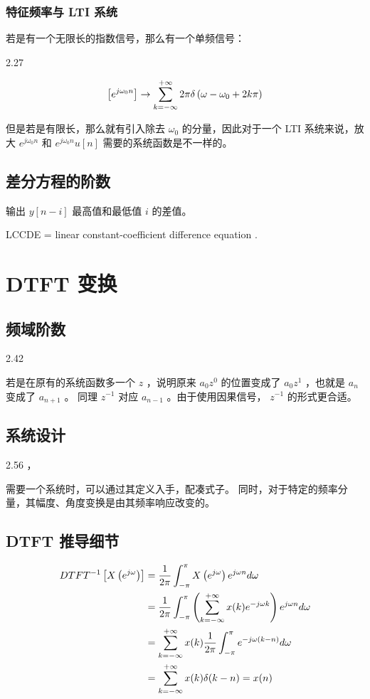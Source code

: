 \documentclass[cn,11pt,chinese,black,simple]{elegantbook}
\begin{document}
\subsection{特征频率与 LTI 系统}

若是有一个无限长的指数信号，那么有一个单频信号：

2.27

\[
    \left[e^{j \omega_{0} n}\right]\rightarrow \displaystyle\sum_{k=-\infty}^{+\infty} 2 \pi \delta\left(\omega-\omega_{0}+2 k \pi\right)
\]

但是若是有限长，那么就有引入除去 \(\omega_0\) 的分量，因此对于一个 LTI 系统来说，放大 \(e^{j \omega_0 n}\) 和 \(e^{j \omega_0 n} u[n]\) 需要的系统函数是不一样的。

\section{差分方程的阶数}

输出 \(y[n-i]\) 最高值和最低值 \(i\) 的差值。

LCCDE = linear constant-coefficient difference equation .



\chapter{DTFT 变换}


\section{频域阶数}

2.42

若是在原有的系统函数多一个 \(z\) ，说明原来 \(a_0 z^0\) 的位置变成了 \(a_0 z^1\) ，也就是 \(a_n\) 变成了 \(a_{n+1}\) 。 同理 \(z^{-1}\) 对应 \(a_{n-1}\) 。由于使用因果信号， \(z^{-1}\) 的形式更合适。

\section{系统设计}

2.56 ，

需要一个系统时，可以通过其定义入手，配凑式子。 同时，对于特定的频率分量，其幅度、角度变换是由其频率响应改变的。

\section{DTFT 推导细节}

\[
\begin{aligned}
D T F T^{-1}\left[X\left(e^{j \omega}\right)\right]&=\dfrac{1}{2 \pi} \int_{-\pi}^{\pi} X\left(e^{j \omega}\right) e^{j \omega n} d \omega \\
&=\dfrac{1}{2 \pi} \int_{-\pi}^{\pi}\left(\displaystyle\sum_{k=-\infty}^{+\infty} x(k) e^{-j \omega k}\right) e^{j \omega n} d \omega \\
&=\displaystyle\sum_{k=-\infty}^{+\infty} x(k) \dfrac{1}{2 \pi} \int_{-\pi}^{\pi} e^{-j \omega(k-n)} d \omega\\
&=\displaystyle\sum_{k=-\infty}^{+\infty} x(k) \delta(k-n)=x(n)
\end{aligned}
\]
\end{document}
